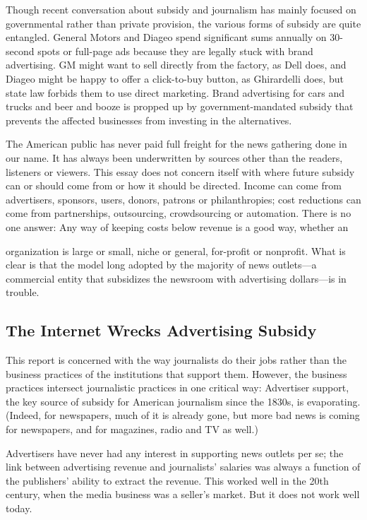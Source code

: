 Though recent conversation about subsidy and journalism has mainly focused
on governmental rather than private provision, the various forms of subsidy are
quite entangled. General Motors and Diageo spend significant sums annually on
30-second spots or full-page ads because they are legally stuck with brand advertising.
GM might want to sell directly from the factory, as Dell does, and Diageo
might be happy to offer a click-to-buy button, as Ghirardelli does, but state law
forbids them to use direct marketing. Brand advertising for cars and trucks and
beer and booze is propped up by government-mandated subsidy that prevents
the affected businesses from investing in the alternatives.

The American public has never paid full freight for the news gathering done in
our name. It has always been underwritten by sources other than the readers,
listeners or viewers. This essay does not concern itself with where future subsidy
can or should come from or how it should be directed. Income can come from
advertisers, sponsors, users, donors, patrons or philanthropies; cost reductions can
come from partnerships, outsourcing, crowdsourcing or automation. There is no
one answer: Any way of keeping costs below revenue is a good way, whether an

organization is large or small, niche or general, for-profit or nonprofit. What is
clear is that the model long adopted by the majority of news outlets—a commercial
entity that subsidizes the newsroom with advertising dollars—is in trouble.

\subsection{The Internet Wrecks Advertising Subsidy}

This report is concerned with the way journalists do their jobs rather than the
business practices of the institutions that support them. However, the business
practices intersect journalistic practices in one critical way: Advertiser support,
the key source of subsidy for American journalism since the 1830s, is evaporating.
(Indeed, for newspapers, much of it is already gone, but more bad news is coming
for newspapers, and for magazines, radio and TV as well.)

Advertisers have never had any interest in supporting news outlets per se; the
link between advertising revenue and journalists’ salaries was always a function
of the publishers’ ability to extract the revenue. This worked well in the 20th
century, when the media business was a seller’s market. But it does not work
well today.

